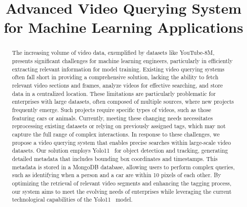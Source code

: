 \documentclass[conference]{IEEEtran}
\begin{document}
\title{Advanced Video Querying System for Machine Learning Applications}

\author{
\and
{}
\and
{}
\and
{}
}

\maketitle

\begin{abstract}
The increasing volume of video data, exemplified by datasets like YouTube-8M\cite{abu2016youtube}, presents significant challenges for machine learning engineers, particularly in efficiently extracting relevant information for model training. Existing video querying systems often fall short in providing a comprehensive solution, lacking the ability to fetch relevant video sections and frames, analyze videos for effective searching, and store data in a centralized location. These limitations are particularly problematic for enterprises with large datasets, often composed of multiple sources, where new projects frequently emerge. Such projects require specific types of videos, such as those featuring cars or animals. Currently, meeting these changing needs necessitates reprocessing existing datasets or relying on previously assigned tags, which may not capture the full range of complex interactions. In response to these challenges, we propose a video querying system that enables precise searches within large-scale video datasets. Our solution employs Yolo11~\cite{yolo11} for object detection and tracking, generating detailed metadata that includes bounding box coordinates and timestamps. This metadata is stored in a MongoDB\cite{mongodb} database, allowing users to perform complex queries, such as identifying when a person and a car are within 10 pixels of each other. By optimizing the retrieval of relevant video segments and enhancing the tagging process, our system aims to meet the evolving needs of enterprises while leveraging the current technological capabilities of the Yolo11~\cite{yolo11} model.
\end{abstract}
\end{document}
